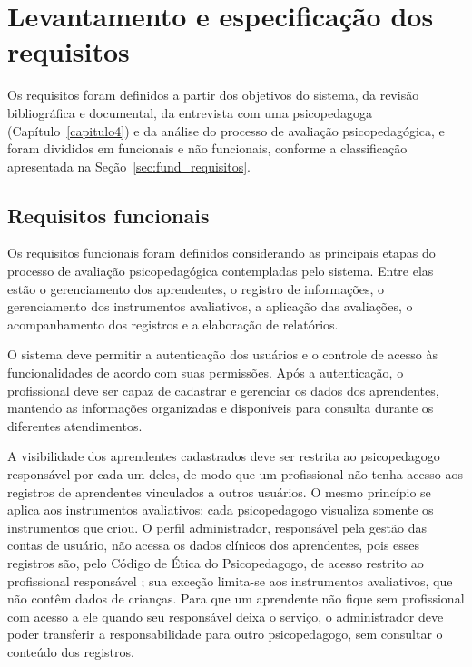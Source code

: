 \section{Levantamento e especificação dos requisitos}\label{sec:requisitos}

Os requisitos foram definidos a partir dos objetivos do sistema, da revisão bibliográfica e documental, da entrevista com uma psicopedagoga (Capítulo~\ref{capitulo4}) e da análise do processo de avaliação psicopedagógica, e foram divididos em funcionais e não funcionais, conforme a classificação apresentada na Seção~\ref{sec:fund_requisitos}.

\subsection{Requisitos funcionais}

Os requisitos funcionais foram definidos considerando as principais etapas do processo de avaliação psicopedagógica contempladas pelo sistema. Entre elas estão o gerenciamento dos aprendentes, o registro de informações, o gerenciamento dos instrumentos avaliativos, a aplicação das avaliações, o acompanhamento dos registros e a elaboração de relatórios.

O sistema deve permitir a autenticação dos usuários e o controle de acesso às funcionalidades de acordo com suas permissões. Após a autenticação, o profissional deve ser capaz de cadastrar e gerenciar os dados dos aprendentes, mantendo as informações organizadas e disponíveis para consulta durante os diferentes atendimentos. 

A visibilidade dos aprendentes cadastrados deve ser restrita ao psicopedagogo responsável por cada um deles, de modo que um profissional não tenha acesso aos registros de aprendentes vinculados a outros usuários. O mesmo princípio se aplica aos instrumentos avaliativos: cada psicopedagogo visualiza somente os instrumentos que criou. O perfil administrador, responsável pela gestão das contas de usuário, não acessa os dados clínicos dos aprendentes, pois esses registros são, pelo Código de Ética do Psicopedagogo, de acesso restrito ao profissional responsável \cite{abpp2019_codigo_etica}; sua exceção limita-se aos instrumentos avaliativos, que não contêm dados de crianças. Para que um aprendente não fique sem profissional com acesso a ele quando seu responsável deixa o serviço, o administrador deve poder transferir a responsabilidade para outro psicopedagogo, sem consultar o conteúdo dos registros.

